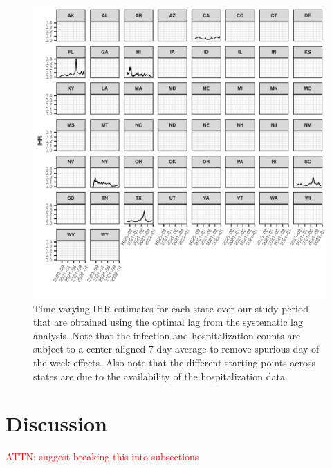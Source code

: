 \documentclass{article}
\newcommand{\attn}[1]{\textcolor{red}{ATTN: #1}}
\begin{document}
\begin{figure}[!tb]
\centering
    \includegraphics[width=.99\textwidth]{IHR_7dav.pdf} 
    \caption{Time-varying IHR estimates for each state over our study period that are obtained using the optimal lag from the systematic lag analysis. Note that the infection and hospitalization counts are subject to a center-aligned 7-day average to remove spurious day of the week effects. Also note that the different starting points across states are due to the availability of the hospitalization data.}
    \label{fig:IHR_7dav}
\end{figure}

\section{Discussion}

\attn{suggest breaking this into subsections}
\end{document}
